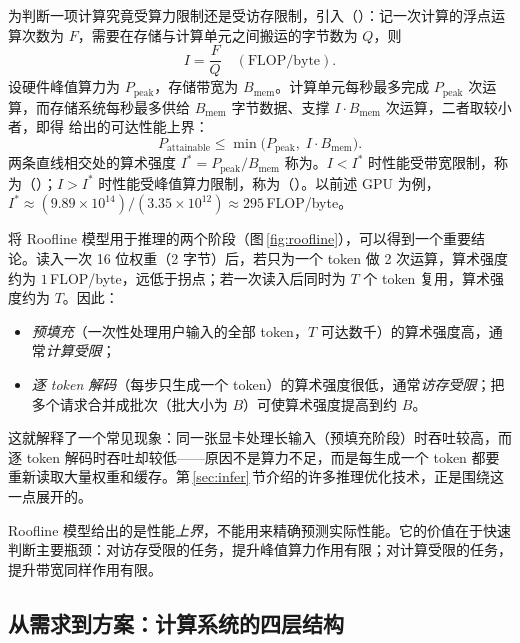 为判断一项计算究竟受算力限制还是受访存限制，引入（）：记一次计算的浮点运算次数为 $F$，需要在存储与计算单元之间搬运的字节数为 $Q$，则
\begin{equation}
  I = \frac{F}{Q}\quad(\text{FLOP/byte}).
\end{equation}
设硬件峰值算力为 $P_{\mathrm{peak}}$，存储带宽为 $B_{\mathrm{mem}}$。计算单元每秒最多完成 $P_{\mathrm{peak}}$ 次运算，而存储系统每秒最多供给 $B_{\mathrm{mem}}$ 字节数据、支撑 $I\cdot B_{\mathrm{mem}}$ 次运算，二者取较小者，即得 \cite{williams2009roofline}给出的可达性能上界：
\begin{equation}
  P_{\mathrm{attainable}} \le \min\bigl(P_{\mathrm{peak}},\; I\cdot B_{\mathrm{mem}}\bigr).
  \label{eq:roofline}
\end{equation}
两条直线相交处的算术强度 $I^{*}=P_{\mathrm{peak}}/B_{\mathrm{mem}}$ 称为。$I<I^{*}$ 时性能受带宽限制，称为（）；$I>I^{*}$ 时性能受峰值算力限制，称为（）。以前述 GPU 为例，$I^{*}\approx (9.89\times10^{14})/(3.35\times10^{12})\approx 295$\,FLOP/byte。



将 Roofline 模型用于推理的两个阶段（图\,\ref{fig:roofline}），可以得到一个重要结论。读入一次 16 位权重（2 字节）后，若只为一个 token 做 2 次运算，算术强度约为 $1$\,FLOP/byte，远低于拐点；若一次读入后同时为 $T$ 个 token 复用，算术强度约为 $T$。因此：
\begin{itemize}
  \item \emph{预填充}（一次性处理用户输入的全部 token，$T$ 可达数千）的算术强度高，通常\emph{计算受限}；
  \item \emph{逐 token 解码}（每步只生成一个 token）的算术强度很低，通常\emph{访存受限}；把多个请求合并成批次（批大小为 $B$）可使算术强度提高到约 $B$。
\end{itemize}
这就解释了一个常见现象：同一张显卡处理长输入（预填充阶段）时吞吐较高，而逐 token 解码时吞吐却较低——原因不是算力不足，而是每生成一个 token 都要重新读取大量权重和缓存。第\,\ref{sec:infer}\,节介绍的许多推理优化技术，正是围绕这一点展开的。

\begin{pitfall}
Roofline 模型给出的是性能\emph{上界}，不能用来精确预测实际性能。它的价值在于快速判断主要瓶颈：对访存受限的任务，提升峰值算力作用有限；对计算受限的任务，提升带宽同样作用有限。
\end{pitfall}

\subsection{从需求到方案：计算系统的四层结构}
\label{subsec:four-layers}

